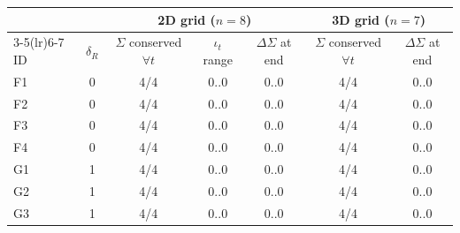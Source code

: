 \begin{tabular}{lcccccc}
\toprule
 & & \multicolumn{3}{c}{2D grid ($n=8$)} & \multicolumn{2}{c}{3D grid ($n=7$)}\\
\cmidrule(lr){3-5}\cmidrule(lr){6-7}
ID & $\delta_R$ & $\Sigma$ conserved $\forall t$ & $\iota_t$ range & $\Delta\Sigma$ at end & $\Sigma$ conserved $\forall t$ & $\Delta\Sigma$ at end\\
\midrule
F1 & 0 & 4/4 & 0..0 & 0..0 & 4/4 & 0..0\\
F2 & 0 & 4/4 & 0..0 & 0..0 & 4/4 & 0..0\\
F3 & 0 & 4/4 & 0..0 & 0..0 & 4/4 & 0..0\\
F4 & 0 & 4/4 & 0..0 & 0..0 & 4/4 & 0..0\\
G1 & 1 & 4/4 & 0..0 & 0..0 & 4/4 & 0..0\\
G2 & 1 & 4/4 & 0..0 & 0..0 & 4/4 & 0..0\\
G3 & 1 & 4/4 & 0..0 & 0..0 & 4/4 & 0..0\\
\bottomrule
\end{tabular}
